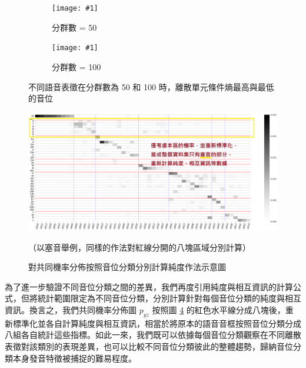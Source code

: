 {

\newcommand{\jeffheightt}[1]{\texttt{[image: \#1]}}

\begin{figure}
     \centering
     \begin{subfigure}{\textwidth}  %
         \centering
         \jeffheightt{figures/phnrank50.png}
         \caption{分群數 = 50}
         \label{fig:phn-specials-clu50}
     \end{subfigure}
     \vfill

     \begin{subfigure}{\textwidth}  %
         \centering
         \jeffheightt{figures/phnrank100.png}
         \caption{分群數 = 100}
         \label{fig:phn-specials-clu100}
     \end{subfigure}

     \caption{不同語音表徵在分群數為 50 和 100 時，離散單元條件熵最高與最低的音位}
     \label{fig:phn-specials}
\end{figure}

}



\begin{figure}
    \centering
    \includegraphics[width=1\linewidth]{figures/better-demo-splitter.png}
    \caption{對共同機率分佈按照音位分類分別計算純度作法示意圖}
    （以塞音舉例，同樣的作法對紅線分開的八塊區域分別計算）
    \label{fig:demo-splitter}
\end{figure}


        為了進一步驗證不同音位分類之間的差異，我們再度引用純度與相互資訊的計算公式，但將統計範圍限定為不同音位分類，分別計算針對每個音位分類的純度與相互資訊。換言之，我們共同機率分佈圖 $p_{yz}$ 按照圖 \ref{fig:demo-splitter} 的紅色水平線分成八塊後，重新標準化並各自計算純度與相互資訊，相當於將原本的語音音框按照音位分類分成八組各自統計這些指標。如此一來，我們既可以依據每個音位分類觀察在不同離散表徵對該類別的表現差異，也可以比較不同音位分類彼此的整體趨勢，歸納音位分類本身發音特徵被捕捉的難易程度。

